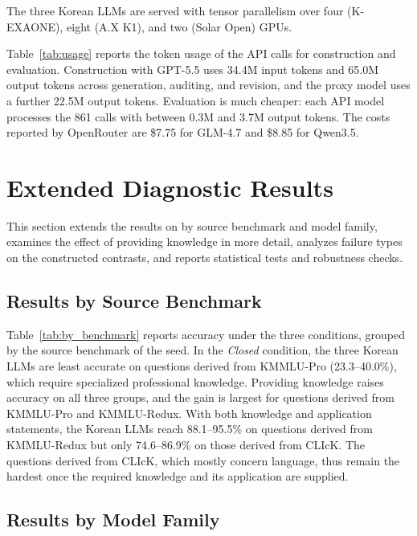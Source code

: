 The three Korean LLMs are served with tensor parallelism over four (K-EXAONE), eight (A.X K1), and two (Solar Open) GPUs.

Table~\ref{tab:usage} reports the token usage of the API calls for construction and evaluation.
Construction with GPT-5.5 uses 34.4M input tokens and 65.0M output tokens across generation, auditing, and revision, and the proxy model uses a further 22.5M output tokens.
Evaluation is much cheaper: each API model processes the 861 calls with between 0.3M and 3.7M output tokens.
The costs reported by OpenRouter are \$7.75 for GLM-4.7 and \$8.85 for Qwen3.5.



\section{Extended Diagnostic Results}
\label{app:extended_results}

This section extends the results on \name{} by source benchmark and model family, examines the effect of providing knowledge in more detail, analyzes failure types on the constructed contrasts, and reports statistical tests and robustness checks.

\subsection{Results by Source Benchmark}

Table~\ref{tab:by_benchmark} reports accuracy under the three conditions, grouped by the source benchmark of the seed.
In the \textit{Closed} condition, the three Korean LLMs are least accurate on questions derived from KMMLU-Pro (23.3--40.0\%), which require specialized professional knowledge.
Providing knowledge raises accuracy on all three groups, and the gain is largest for questions derived from KMMLU-Pro and KMMLU-Redux.
With both knowledge and application statements, the Korean LLMs reach 88.1--95.5\% on questions derived from KMMLU-Redux but only 74.6--86.9\% on those derived from CLIcK.
The questions derived from CLIcK, which mostly concern language, thus remain the hardest once the required knowledge and its application are supplied.



\subsection{Results by Model Family}

